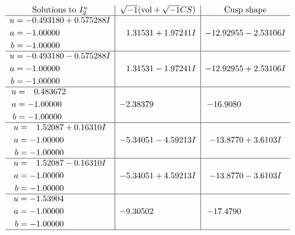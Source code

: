 \documentclass[1p]{elsarticle_modified}
\theoremstyle{definition}
\newcommand{\I}{\sqrt{-1}}
\begin{document}
$$\begin{array}{c|c|c}  
\text{Solutions to }I^u_{2}& \I (\text{vol} + \sqrt{-1}CS) & \text{Cusp shape}\\
 \hline 
\begin{aligned}
u &= -0.493180 + 0.575288 I \\
a &= -1.00000\phantom{ +0.000000I} \\
b &= -1.00000\phantom{ +0.000000I}\end{aligned}
 & \phantom{-}1.31531 + 1.97241 I & -12.92955 - 2.53106 I \\ \hline\begin{aligned}
u &= -0.493180 - 0.575288 I \\
a &= -1.00000\phantom{ +0.000000I} \\
b &= -1.00000\phantom{ +0.000000I}\end{aligned}
 & \phantom{-}1.31531 - 1.97241 I & -12.92955 + 2.53106 I \\ \hline\begin{aligned}
u &= \phantom{-}0.483672\phantom{ +0.000000I} \\
a &= -1.00000\phantom{ +0.000000I} \\
b &= -1.00000\phantom{ +0.000000I}\end{aligned}
 & -2.38379\phantom{ +0.000000I} & -16.9080\phantom{ +0.000000I} \\ \hline\begin{aligned}
u &= \phantom{-}1.52087 + 0.16310 I \\
a &= -1.00000\phantom{ +0.000000I} \\
b &= -1.00000\phantom{ +0.000000I}\end{aligned}
 & -5.34051 - 4.59213 I & -13.8770 + 3.6103 I \\ \hline\begin{aligned}
u &= \phantom{-}1.52087 - 0.16310 I \\
a &= -1.00000\phantom{ +0.000000I} \\
b &= -1.00000\phantom{ +0.000000I}\end{aligned}
 & -5.34051 + 4.59213 I & -13.8770 - 3.6103 I \\ \hline\begin{aligned}
u &= -1.53904\phantom{ +0.000000I} \\
a &= -1.00000\phantom{ +0.000000I} \\
b &= -1.00000\phantom{ +0.000000I}\end{aligned}
 & -9.30502\phantom{ +0.000000I} & -17.4790\phantom{ +0.000000I}\\
 \hline 
 \end{array}$$\newpage
\end{document}
